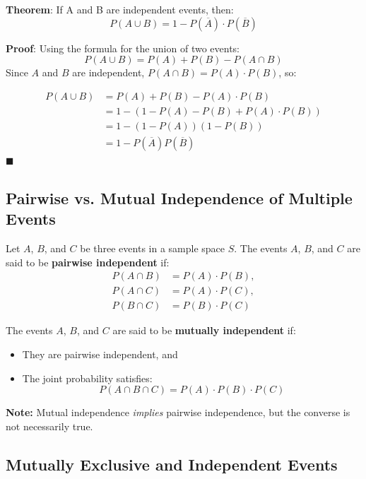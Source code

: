 \documentclass[twoside]{book}
\begin{document}
\begin{textbox}
    \textbf{Theorem}: If A and B are independent events, then:
\[
P(A \cup B) = 1 - P(\overline{A})\cdot P(\overline{B})
\]
\end{textbox}

\textbf{Proof}: Using the formula for the union of two events:
\[
P(A \cup B) = P(A) + P(B) - P(A \cap B)
\]
Since \( A \) and \( B \) are independent, \( P(A \cap B) = P(A)\cdot P(B) \), so:

\begin{align*}
    P(A \cup B) &= P(A) + P(B) - P(A)\cdot P(B) \\
    &= 1 - \left(1 - P(A) - P(B) + P(A)\cdot P(B)\right) \\
    &= 1- (1-P(A))(1-P(B)) \\
    &= 1 - P(\overline{A})P(\overline{B})
\end{align*}
\hfill\(\blacksquare\)

\subsection{Pairwise vs. Mutual Independence of Multiple Events}

Let \( A \), \( B \), and \( C \) be three events in a sample space \( S \). The events \( A \), \( B \), and \( C \) are said to be \textbf{pairwise independent} if:
\[
\begin{aligned}
P(A \cap B) &= P(A) \cdot P(B), \\
P(A \cap C) &= P(A) \cdot P(C), \\
P(B \cap C) &= P(B) \cdot P(C)
\end{aligned}
\]

The events \( A \), \( B \), and \( C \) are said to be \textbf{mutually independent} if:
\begin{itemize}
    \item They are pairwise independent, and
    \item The joint probability satisfies:
    \[
    P(A \cap B \cap C) = P(A) \cdot P(B) \cdot P(C)
    \]
\end{itemize}

\textbf{Note:} Mutual independence \emph{implies} pairwise independence, but the converse is not necessarily true.

\subsection{Mutually Exclusive and Independent Events}
\end{document}
